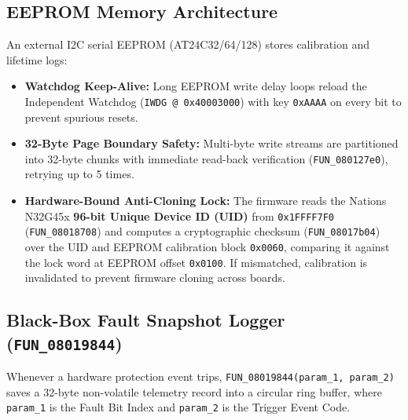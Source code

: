 \documentclass[10pt,a4paper]{article}
\begin{document}
\subsection{EEPROM Memory Architecture}
An external I2C serial EEPROM (AT24C32/64/128) stores calibration and lifetime logs:
\begin{itemize}
    \item \textbf{Watchdog Keep-Alive:} Long EEPROM write delay loops reload the Independent Watchdog (\texttt{IWDG @ 0x40003000}) with key \texttt{0xAAAA} on every bit to prevent spurious resets.
    \item \textbf{32-Byte Page Boundary Safety:} Multi-byte write streams are partitioned into 32-byte chunks with immediate read-back verification (\texttt{FUN\_080127e0}), retrying up to 5 times.
    \item \textbf{Hardware-Bound Anti-Cloning Lock:} The firmware reads the Nations N32G45x \textbf{96-bit Unique Device ID (UID)} from \texttt{0x1FFFF7F0} (\texttt{FUN\_08018708}) and computes a cryptographic checksum (\texttt{FUN\_08017b04}) over the UID and EEPROM calibration block \texttt{0x0060}, comparing it against the lock word at EEPROM offset \texttt{0x0100}. If mismatched, calibration is invalidated to prevent firmware cloning across boards.
\end{itemize}

\subsection{Black-Box Fault Snapshot Logger (\texttt{FUN\_08019844})}
Whenever a hardware protection event trips, \texttt{FUN\_08019844(param\_1, param\_2)} saves a 32-byte non-volatile telemetry record into a circular ring buffer, where \texttt{param\_1} is the Fault Bit Index and \texttt{param\_2} is the Trigger Event Code.
\end{document}
